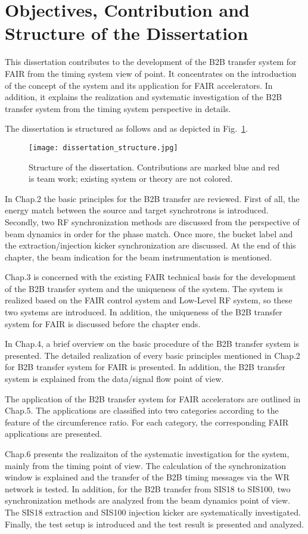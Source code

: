 \section{Objectives, Contribution and Structure of the Dissertation}
This dissertation contributes to the development of the B2B transfer system for FAIR from the timing system view of point. It concentrates on the introduction of the concept of the system and its application for FAIR accelerators. In addition, it explains the realization and systematic investigation of the B2B transfer system from the timing system perspective in details.

The dissertation is structured as follows and as depicted in Fig.~\ref{dissertation_structure}.
\begin{figure}[H]
   \centering   
   \texttt{[image: dissertation\_structure.jpg]}
   \caption{Structure of the dissertation. Contributions are marked blue and red is team work; existing system or theory are not colored.}
   \label{dissertation_structure}
\end{figure}

In Chap.2 the basic principles for the B2B transfer are reviewed. First of all, the energy match between the source and target synchrotrons is introduced. Secondly, two RF synchronization methods are discussed from the perspective of beam dynamics in order for the phase match. Once more, the bucket label and the extraction/injection kicker synchronization are discussed. At the end of this chapter, the beam indication for the beam instrumentation is mentioned.

Chap.3 is concerned with the existing FAIR technical basis for the development of the B2B transfer system and the uniqueness of the system. The system is realized based on the FAIR control system and Low-Level RF system, so these two systems are introduced. In addition, the uniqueness of the B2B transfer system for FAIR is discussed before the chapter ends. 

In Chap.4, a brief overview on the basic procedure of the B2B transfer system is presented. The detailed realization of every basic principles mentioned in Chap.2 for B2B transfer system for FAIR is presented. In addition, the B2B transfer system is explained from the data/signal flow point of view.

The application of the B2B transfer system for FAIR accelerators are outlined in Chap.5. The applications are classified into two categories according to the feature of the circumference ratio. For each category, the corresponding FAIR applications are presented. 

Chap.6 presents the realizaiton of the systematic investigation for the system, mainly from the timing point of view. The calculation of the synchronization window is explained and the transfer of the B2B timing messages via the WR network is tested. In addition, for the B2B transfer from SIS18 to SIS100, two synchronization methods are analyzed from the beam dynamics point of view. The SIS18 extraction and SIS100 injection kicker are systematically investigated. Finally, the test setup is introduced and the test result is presented and analyzed.



